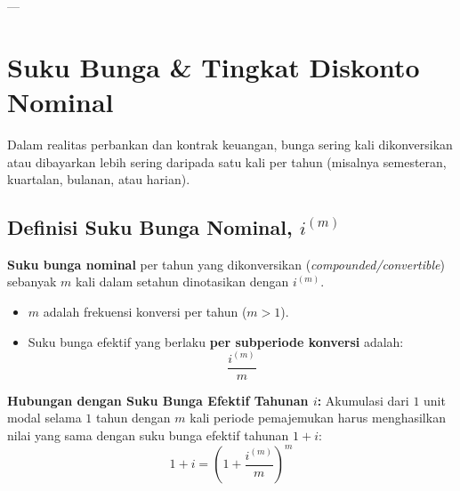 \documentclass[11pt,a4paper]{article}
\begin{document}
---

\section{Suku Bunga \& Tingkat Diskonto Nominal}

Dalam realitas perbankan dan kontrak keuangan, bunga sering kali dikonversikan atau dibayarkan lebih sering daripada satu kali per tahun (misalnya semesteran, kuartalan, bulanan, atau harian). 

\subsection{Definisi Suku Bunga Nominal, $i^{(m)}$}
\begin{definitionbox}
\textbf{Suku bunga nominal} per tahun yang dikonversikan (\textit{compounded/convertible}) sebanyak $m$ kali dalam setahun dinotasikan dengan $i^{(m)}$.
\begin{itemize}[leftmargin=1.5em]
    \item $m$ adalah frekuensi konversi per tahun ($m > 1$).
    \item Suku bunga efektif yang berlaku \textbf{per subperiode konversi} adalah:
    \begin{equation}
        \frac{i^{(m)}}{m}
    \end{equation}
\end{itemize}
\end{definitionbox}

\textbf{Hubungan dengan Suku Bunga Efektif Tahunan $i$:}
Akumulasi dari $1$ unit modal selama $1$ tahun dengan $m$ kali periode pemajemukan harus menghasilkan nilai yang sama dengan suku bunga efektif tahunan $1 + i$:
\begin{equation}
    1 + i = \left( 1 + \frac{i^{(m)}}{m} \right)^m
\end{equation}
\end{document}
